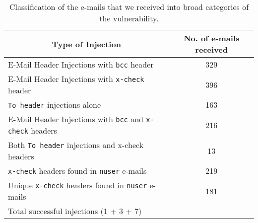 \begin{table*}[tbp]
	\centering
	\begin{tabular}{|l|c|}
		\hline
		\multicolumn{1}{|c|}{\textbf{Type of Injection}} &
		\multicolumn{1}{p{3cm}|}{\centering \textbf{No. of e-mails received}}\\
		\hline
		E-Mail Header Injections with \texttt{bcc} header & 329\\
		\hline
		E-Mail Header Injections with \texttt{x-check} header & 396\\
		\hline
		\texttt{To header} injections alone & 163\\
		\hline
		E-Mail Header Injections with \texttt{bcc} and \texttt{x-check} headers & 216\\
		\hline
		Both \texttt{To header} injections and x-check headers &
		13\\
		\hline
		\texttt{x-check} headers found in \texttt{nuser} e-mails & 219\\
		\hline
		Unique \texttt{x-check} headers found in \texttt{nuser} e-mails & 181\\
		\hline
		Total successful injections (1 + 3 + 7) & \success\ \\
		
		\hline
	\end{tabular}
	\caption[]{Classification of the e-mails that we received into broad categories of the vulnerability.}
	\label{tab:analysis}
\end{table*}
